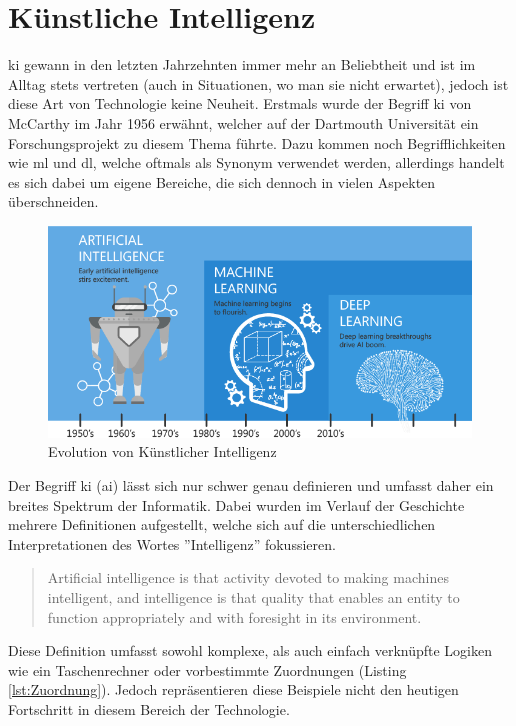\section{Künstliche Intelligenz}

\gls{ki} gewann in den letzten Jahrzehnten immer mehr an Beliebtheit und ist im Alltag stets vertreten (auch in Situationen, wo man sie nicht erwartet), jedoch ist diese Art von Technologie keine Neuheit. Erstmals wurde der Begriff \Gls{ki} von McCarthy im Jahr 1956 erwähnt, welcher auf der Dartmouth Universität ein Forschungsprojekt zu diesem Thema führte. \cite{100YAI} Dazu kommen noch Begrifflichkeiten wie \gls{ml} und \gls{dl}, welche oftmals als Synonym verwendet werden, allerdings handelt es sich dabei um eigene Bereiche, die sich dennoch in vielen Aspekten überschneiden.

\begin{figure}[H]
    \centering
    \includegraphics[scale=0.55]{sections/machine-learning/images/ki-ml-dl.png}
    \caption{Evolution von Künstlicher Intelligenz}
\end{figure}

Der Begriff \gls{ki} (\gls{ai}) lässt sich nur schwer genau definieren und umfasst daher ein breites Spektrum der Informatik. Dabei wurden im Verlauf der Geschichte mehrere Definitionen aufgestellt, welche sich auf die unterschiedlichen Interpretationen des Wortes ''Intelligenz'' fokussieren.

\begin{quote}
    Artificial intelligence is that activity devoted to making machines intelligent,
    and intelligence is that quality that enables an entity to function appropriately
    and with foresight in its environment. \cite{TQFAI}
\end{quote}

Diese Definition umfasst sowohl komplexe, als auch einfach verknüpfte Logiken wie ein Taschenrechner oder vorbestimmte Zuordnungen (Listing \ref*{lst:Zuordnung}). Jedoch repräsentieren diese Beispiele nicht den heutigen Fortschritt in diesem Bereich der Technologie.

